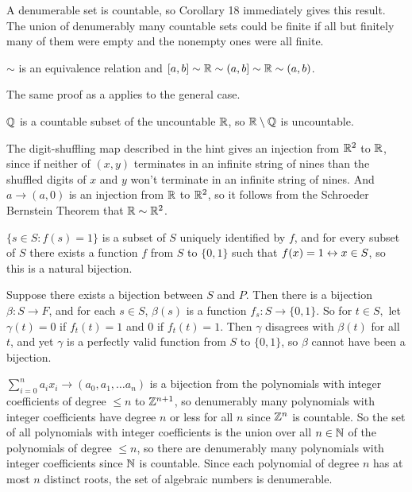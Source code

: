 \documentclass[11pt, oneside]{article}   	%
\begin{document}
\item A denumerable set is countable, so Corollary 18 immediately gives this result. The union of denumerably many countable sets could be finite if all but finitely many of them were empty and the nonempty ones were all finite.
\item \be
\item $\sim$ is an equivalence relation and $[a, b] \sim \mathbb{R} \sim (a, b] \sim \mathbb{R} \sim (a, b)$.
\item The same proof as a applies to the general case.
\item $\mathbb{Q}$ is a countable subset of the uncountable $\mathbb{R}$, so $\mathbb{R} \setminus \mathbb{Q}$ is uncountable.
\ee
\item The digit-shuffling map described in the hint gives an injection from $\mathbb{R}^2$ to $\mathbb{R}$, since if neither of $(x, y)$ terminates in an infinite string of nines than the shuffled digits of $x$ and $y$ won't terminate in an infinite string of nines. And $a \to (a, 0)$ is an injection from $\mathbb{R}$ to $\mathbb{R}^2$, so it follows from the Schroeder Bernstein Theorem that $\mathbb{R} \sim \mathbb{R}^2$.
\item \be
\item $\{s \in S: f(s) = 1\}$ is a subset of $S$ uniquely identified by $f$, and for every subset of $S$ there exists a function $f$ from $S$ to $\{0, 1\}$ such that $f(x) = 1 \leftrightarrow x \in S$, so this is a natural bijection.
\item Suppose there exists a bijection between $S$ and $P$. Then there is a bijection $\beta: S \to F$, and for each $s\in S$, $\beta(s)$ is a function $f_s: S \to \{0, 1\}$. So for $t \in S,$ let $\gamma(t) = 0$ if $f_t(t) = 1$ and 0 if $f_t(t) = 1$. Then $\gamma$ disagrees with $\beta(t)$ for all $t$, and yet $\gamma$ is a perfectly valid function from $S$ to $\{0, 1\}$, so $\beta$ cannot have been a bijection.
\ee
\item \be
\item $\sum_{i=0}^na_ix_i \to (a_0, a_1, \ldots a_n)$ is a bijection from the polynomials with integer coefficients of degree $\le n$ to $\mathbb{Z}^{n+1}$, so denumerably many polynomials with integer coefficients have degree $n$ or less for all $n$ since $\mathbb{Z}^n$ is countable. So the set of all polynomials with integer coefficients is the union over all $n \in \mathbb{N}$ of the polynomials of degree $\le n$, so there are denumerably many polynomials with integer coefficients since $\mathbb{N}$ is countable. Since each polynomial of degree $n$ has at most $n$ distinct roots, the set of algebraic numbers is denumerable.
\end{document}
